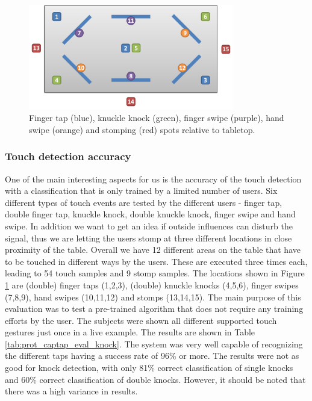 \begin{figure}[ht]
\centering
\includegraphics[width=0.8\textwidth]{images/eval_touch_v2}
\caption{Finger tap (blue), knuckle knock (green), finger swipe (purple), hand swipe (orange) and stomping (red) spots relative to tabletop.}
\label{fig:eval_touch_v2}
\end{figure}

\subsubsection*{Touch detection accuracy}
One of the main interesting aspects for us is the accuracy of the touch detection with a classification that is only trained by a limited number of users. Six different types of touch events are tested by the different users - finger tap, double finger tap, knuckle knock, double knuckle knock, finger swipe and hand swipe. In addition we want to get an idea if outside influences can disturb the signal, thus we are letting the users stomp at three different locations in close proximity of the table. Overall we have 12 different areas on the table that have to be touched in different ways by the users. These are executed three times each, leading to 54 touch samples and 9 stomp samples. The locations shown in Figure \ref{fig:eval_touch_v2} are (double) finger taps (1,2,3), (double) knuckle knocks (4,5,6), finger swipes (7,8,9), hand swipes (10,11,12) and  stomps (13,14,15). The main purpose of this evaluation was to test a pre-trained algorithm that does not require any training efforts by the user. The subjects were shown all different supported touch gestures just once in a live example. The results are shown in Table \ref{tab:prot_captap_eval_knock}. The system was very well capable of recognizing the different taps having a success rate of 96\% or more. The results were not as good for knock detection, with only 81\% correct classification of single knocks and 60\% correct classification of double knocks. However, it should be noted that there was a high variance in results.
 
